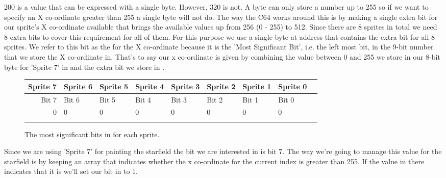 200 is a value that can be expressed with a single byte. However, 320 is not. A byte can only store a number up to 255
so if we want to specify an X co-ordinate greater than 255 a single byte will not do. The way the C64 works around this
is by making a single extra bit for our sprite's X co-ordinate available that brings the available values up from 256
(0 - 255) to 512. Since there are 8 sprites in total we need 8 extra bits to cover this requirement for all of them.
For this purpose we use a single byte at address  that contains the extra bit for all 8 sprites. We refer
to this bit as the  for the X co-ordinate because it is the 'Most Significant Bit', i.e. the left most bit,
in the 9-bit number that we store the X co-ordinate in. That's to say our x co-ordinate is given by combining the value
between 0 and 255 we store in our 8-bit byte for 'Sprite 7' in  and the extra bit we store in .

\begin{figure}[H]
  {
    \setlength{\tabcolsep}{3.0pt}
    \setlength\cmidrulewidth{\heavyrulewidth} %
    \begin{adjustbox}{width=10cm,center}

      \begin{tabular}{rllllllll}
        \toprule
        Sprite 7 & Sprite 6 & Sprite 5 & Sprite 4 & Sprite 3 & Sprite 2 & Sprite 1 & Sprite 0        \\
        \midrule
        Bit 7 & Bit 6 & Bit 5 & Bit 4 & Bit 3 & Bit 2 & Bit 1 & Bit 0        \\
        \midrule
        0 & 0 & 0 & 0 & 0 & 0 & 0 & 0 \\
        \addlinespace
        \bottomrule
      \end{tabular}

    \end{adjustbox}

  }\caption*{The most significant bits in  for each sprite.}
\end{figure}

Since we are using 'Sprite 7' for painting the starfield the bit we are interested in is bit 7. The way
we're going to manage this value for the starfield is by keeping an array 
that indicates whether the x co-ordinate for the current index is greater than 255. If the value in there
indicates that it is we'll set our bit in  to 1.

